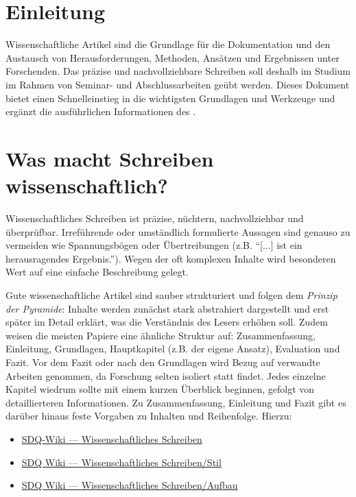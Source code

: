 \section{Einleitung}
\label{sec:Einleitung}

Wissenschaftliche Artikel sind die Grundlage für die Dokumentation und den Austausch von Herausforderungen, Methoden, Ansätzen und Ergebnissen unter Forschenden. 
Das präzise und nachvollziehbare Schreiben soll deshalb im Studium im Rahmen von Seminar- und Abschlussarbeiten geübt werden. 
Dieses Dokument bietet einen Schnelleinstieg in die wichtigsten Grundlagen und Werkzeuge und ergänzt die ausführlichen Informationen des .


\section{Was macht Schreiben wissenschaftlich?}
\label{sec:WissenschaftlichesSchreiben}

Wissenschaftliches Schreiben ist präzise, nüchtern, nachvollziehbar und überprüfbar. 
Irreführende oder umständlich formulierte Aussagen sind genauso zu vermeiden wie Spannungsbögen oder Übertreibungen (z.B. \enquote{[...] ist ein herausragendes Ergebnis.}). 
Wegen der oft komplexen Inhalte wird besonderen Wert auf eine einfache Beschreibung gelegt.

Gute wissenschaftliche Artikel sind sauber strukturiert und folgen dem \emph{Prinzip der Pyramide}: 
Inhalte werden zunächst stark abstrahiert dargestellt und erst später im Detail erklärt, was die Verständnis des Lesers erhöhen soll. 
Zudem weisen die meisten Papiere eine ähnliche Struktur auf: Zusammenfassung, Einleitung, Grundlagen, Hauptkapitel (z.B. der eigene Ansatz), Evaluation und Fazit. 
Vor dem Fazit oder nach den Grundlagen wird Bezug auf verwandte Arbeiten genommen, da Forschung selten isoliert statt findet. 
Jedes einzelne Kapitel wiedrum sollte mit einem kurzen Überblick beginnen, gefolgt von detaillierteren Informationen. 
Zu Zusammenfassung, Einleitung und Fazit gibt es darüber hinaus feste Vorgaben zu Inhalten und Reihenfolge. 
Hierzu:

\smallskip
\begin{itemize}[label={\symbolInfo}]
    \item \href{https://sdqweb.ipd.kit.edu/wiki/Wissenschaftliches_Schreiben}{SDQ-Wiki --- Wissenschaftliches Schreiben }
    \item \href{https://sdqweb.ipd.kit.edu/wiki/Wissenschaftliches_Schreiben/Stil}{SDQ Wiki --- Wissenschaftliches Schreiben/Stil}
    \item \href{https://sdqweb.ipd.kit.edu/wiki/Wissenschaftliches_Schreiben/Aufbau}{SDQ Wiki --- Wissenschaftliches Schreiben/Aufbau}
\end{itemize}


